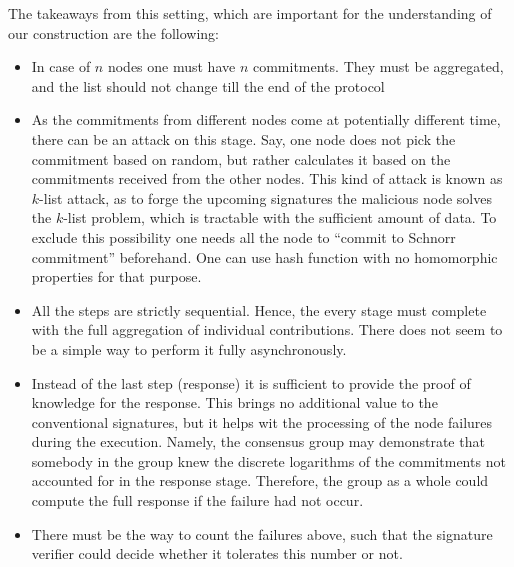 The takeaways from this setting, which are important for the understanding of our construction are the following:
\begin{itemize}
    \item In case of $n$ nodes one must have $n$ commitments. They must be aggregated, and the list should not change
        till the end of the protocol
    \item As the commitments from different nodes come at potentially different time, there can be an attack on this
        stage. Say, one node does not pick the commitment based on random, but rather calculates it based on the
        commitments received from the other nodes. This kind of attack is known as $k$-list attack, as to forge the
        upcoming signatures the malicious node solves the $k$-list problem, which is tractable with the sufficient
        amount of data. To exclude this possibility one needs all the node to ``commit to Schnorr commitment''
        beforehand. One can use hash function with no homomorphic properties for that purpose.
    \item All the steps are strictly sequential. Hence, the every stage must complete with the full aggregation of
        individual contributions. There does not seem to be a simple way to perform it fully asynchronously.
    \item Instead of the last step (response) it is sufficient to provide the proof of knowledge for the response. This
        brings no additional value to the conventional signatures, but it helps wit the processing of the node failures
        during the execution. Namely, the consensus group may demonstrate that somebody in the group knew the discrete
        logarithms of the commitments not accounted for in the response stage. Therefore, the group as a whole could
        compute the full response if the failure had not occur.
    \item There must be the way to count the failures above, such that the signature verifier could decide whether it
        tolerates this number or not.
\end{itemize}

